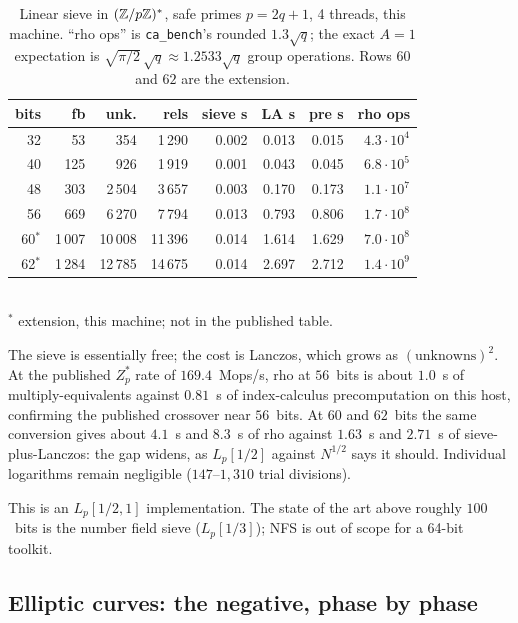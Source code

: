 \begin{table}[t]
\centering
\small
\caption{Linear sieve in $(\mathbb{Z}/p\mathbb{Z})^*$, safe primes $p=2q+1$, 4
  threads, this machine. ``rho ops'' is \texttt{ca\_bench}'s rounded
  $1.3\sqrt{q}$; the exact $A=1$ expectation is
  $\sqrt{\pi/2}\,\sqrt{q}\approx 1.2533\sqrt{q}$ group operations. Rows $60$ and
  $62$ are the extension.}
\label{tab:ic-zp}
\begin{tabular}{@{}rrrrrrrr@{}}
\toprule
bits & fb & unk. & rels & sieve s & LA s & pre s & rho ops \\
\midrule
32 & 53 & 354 & 1\,290 & 0.002 & 0.013 & 0.015 & $4.3\cdot 10^{4}$ \\
40 & 125 & 926 & 1\,919 & 0.001 & 0.043 & 0.045 & $6.8\cdot 10^{5}$ \\
48 & 303 & 2\,504 & 3\,657 & 0.003 & 0.170 & 0.173 & $1.1\cdot 10^{7}$ \\
56 & 669 & 6\,270 & 7\,794 & 0.013 & 0.793 & 0.806 & $1.7\cdot 10^{8}$ \\
60$^*$ & 1\,007 & 10\,008 & 11\,396 & 0.014 & 1.614 & 1.629 & $7.0\cdot 10^{8}$ \\
62$^*$ & 1\,284 & 12\,785 & 14\,675 & 0.014 & 2.697 & 2.712 & $1.4\cdot 10^{9}$ \\
\bottomrule
\end{tabular}\\[0.3em]
{\footnotesize $^*$ extension, this machine; not in the published table.}
\end{table}

The sieve is essentially free; the cost is Lanczos, which grows as
$(\text{unknowns})^2$. At the published $Z_p^*$ rate of $169.4$~Mops/s,
rho at $56$~bits is about $1.0$~s of multiply-equivalents against
$0.81$~s of index-calculus precomputation on this host, confirming the
published crossover near $56$~bits. At $60$ and $62$~bits the same
conversion gives about $4.1$~s and $8.3$~s of rho against $1.63$~s and
$2.71$~s of sieve-plus-Lanczos: the gap widens, as $L_p[1/2]$ against
$N^{1/2}$ says it should. Individual logarithms remain negligible
($147$--$1{,}310$ trial divisions).

This is an $L_p[1/2,1]$ implementation. The state of the art above
roughly $100$~bits is the number field sieve ($L_p[1/3]$); NFS is out
of scope for a 64-bit toolkit.

\subsection{Elliptic curves: the negative, phase by phase}
\label{sec:ic-elliptic}

